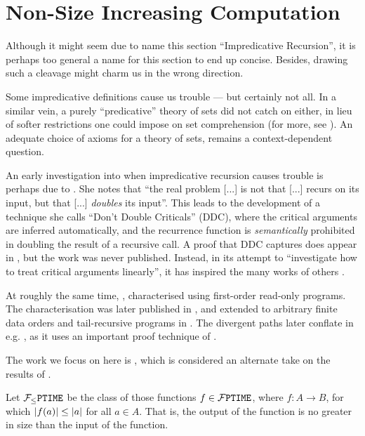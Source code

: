 \chapter{Non-Size Increasing Computation}

Although it might seem due to name this section ``Impredicative Recursion'', it
is perhaps too general a name for this section to end up concise. Besides,
drawing such a cleavage might charm us in the wrong direction.

Some impredicative definitions cause us trouble --- but certainly not all.  In
a similar vein, a purely ``predicative'' theory of sets did not catch on
either, in lieu of softer restrictions one could impose on set comprehension
(for more, see \cite{feferman-1964}). An adequate choice of axioms for a theory
of sets, remains a context-dependent question.

An early investigation into when impredicative recursion causes trouble is
perhaps due to \cite{caseiro-1996}. She notes that ``the real problem [...] is
not that [...] recurs on its input, but that [...] \emph{doubles} its input''.
This leads to the development of a technique she calls ``Don't Double
Criticals'' (DDC), where the critical arguments are inferred automatically, and
the recurrence function is \emph{semantically} prohibited in doubling the
result of a recursive call. A proof that DDC captures \FPTIME{} does appear in
\cite{caseiro-1996}, but the work was never published. Instead, in its attempt
to ``investigate how to treat critical arguments linearly'', it has inspired
the many works of others \cite{bellantoni-et-al-2000,
aehlig-schwichtenberg-2002, hofmann-2003}.

At roughly the same time, \cite[\textsection~24]{jones-1997}, characterised
\PTIME{} using first-order read-only programs. The characterisation was later
published in \cite{jones-1999}, and extended to arbitrary finite data orders
and tail-recursive programs in \cite{jones-2001}. The divergent paths later
conflate in e.g. \cite{hofmann-2002}, as it uses an important proof technique
of \cite{jones-2001}.

The work we focus on here is \cite{aehlig-schwichtenberg-2002}, which is
considered an alternate take on the results of \cite{hofmann-2003}.

\begin{definition} Let $\mathcal{F}_{\leq}\mathtt{PTIME}{}$ be the class of those functions $f \in
\mathcal{F}\mathtt{PTIME}{}$, where $f : A \rightarrow B$, for which ${\mathopen{}\left|{f{\mathopen{}\left({a}\right)\mathclose{}}}\right|\mathclose{}} \leq
{\ensuremath{\mathopen{}\left|{a}\right|\mathclose{}}}$ for all $a \in A$. That is, the output of the function is no greater
in size than the input of the function. \end{definition}

